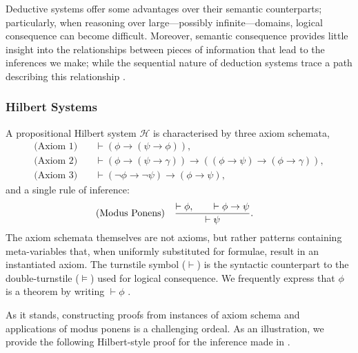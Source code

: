 Deductive systems offer some advantages over their semantic counterparts; particularly, when reasoning over large---possibly infinite---domains, logical consequence can become difficult. Moreover, semantic consequence provides little insight into the relationships between pieces of information that lead to the inferences we make; while the sequential nature of deduction systems trace a path describing this relationship \cite[p. 55]{Ben1993Mathematical}.

\subsubsection{Hilbert Systems}
\label{subsubsection:hilbert-systems}

A propositional Hilbert system $\mathcal{H}$ is characterised by three axiom schemata, 
\begin{align}
    \text{(Axiom 1)} \quad & \vdash (\phi \rightarrow (\psi \rightarrow \phi)),  \\
    \text{(Axiom 2)} \quad & \vdash (\phi \rightarrow (\psi \rightarrow \gamma)) \rightarrow ((\phi \rightarrow \psi) \rightarrow (\phi \rightarrow \gamma)), \\
    \text{(Axiom 3)} \quad & \vdash (\neg \phi \rightarrow \neg \psi) \rightarrow (\phi \rightarrow \psi),
\end{align}
%
and a single rule of inference:
%
\begin{align}
     \index{Rule of inference! \textit{modus ponens}}
     \text{(Modus Ponens)} \quad & \frac{\vdash \phi, \qquad \vdash \phi \rightarrow \psi}{\vdash \psi}.
\end{align}
%
The axiom schemata themselves are not axioms, but rather patterns containing meta-variables that, when uniformly substituted for formulae, result in an instantiated axiom. The turnstile symbol ($\vdash$) is the syntactic counterpart to the double-turnstile ($\vDash$) used for logical consequence. We frequently express that $\phi$ is a theorem by writing $\vdash \phi$ \cite[p. 55]{Ben1993Mathematical}.

As it stands, constructing proofs from instances of axiom schema and applications of modus ponens is a challenging ordeal. As an illustration, we provide the following Hilbert-style proof for the inference made in .

